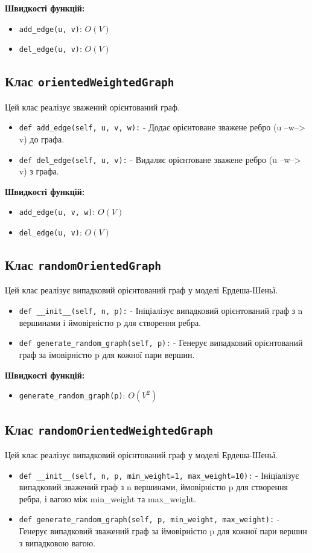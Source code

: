 \documentclass{article}
\begin{document}
\textbf{Швидкості функцій:}
\begin{itemize}
    \item \texttt{add\_edge(u, v)}: $O(V)$
    \item \texttt{del\_edge(u, v)}: $O(V)$
\end{itemize}

\subsection{Клас \texttt{orientedWeightedGraph}}
Цей клас реалізує зважений орієнтований граф.

\begin{itemize}
    \item \texttt{def add\_edge(self, u, v, w):} - Додає орієнтоване зважене ребро (u --w--> v) до графа.
    \item \texttt{def del\_edge(self, u, v):} - Видаляє орієнтоване зважене ребро (u --w--> v) з графа.
\end{itemize}


\textbf{Швидкості функцій:}
\begin{itemize}
    \item \texttt{add\_edge(u, v, w)}: $O(V)$
    \item \texttt{del\_edge(u, v)}: $O(V)$
\end{itemize}

\subsection{Клас \texttt{randomOrientedGraph}}
Цей клас реалізує випадковий орієнтований граф у моделі Ердеша-Шеньї.
\begin{itemize}
    \item \texttt{def \_\_init\_\_(self, n, p):} - Ініціалізує випадковий орієнтований граф з n вершинами і ймовірністю p для створення ребра.
    \item \texttt{def generate\_random\_graph(self, p):} - Генерує випадковий орієнтований граф за імовірністю p для кожної пари вершин.
\end{itemize}

\textbf{Швидкості функцій:}
\begin{itemize}
    \item \texttt{generate\_random\_graph(p)}: $O(V^2)$
\end{itemize}

\subsection{Клас \texttt{randomOrientedWeightedGraph}}
Цей клас реалізує випадковий орієнтований граф у моделі Ердеша-Шеньї.
\begin{itemize}
    \item \texttt{def \_\_init\_\_(self, n, p, min\_weight=1, max\_weight=10):} - Ініціалізує випадковий зважений граф з n вершинами, ймовірністю p для створення ребра, і вагою між min\_weight та max\_weight.
    \item \texttt{def generate\_random\_graph(self, p, min\_weight, max\_weight):} - Генерує випадковий зважений граф за ймовірністю p для кожної пари вершин з випадковою вагою.
\end{itemize}
\end{document}
